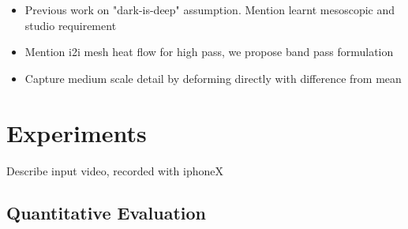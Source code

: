 \documentclass[10pt,twocolumn,letterpaper]{article}
\begin{document}
\begin{itemize}
    \item Previous work on "dark-is-deep" assumption. Mention learnt mesoscopic and studio requirement
    \item Mention i2i mesh heat flow for high pass, we propose band pass formulation 
    \item Capture medium scale detail by deforming directly with difference from mean
\end{itemize}

\section{Experiments}

Describe input video, recorded with iphoneX 

\subsection{Quantitative Evaluation}
\end{document}

